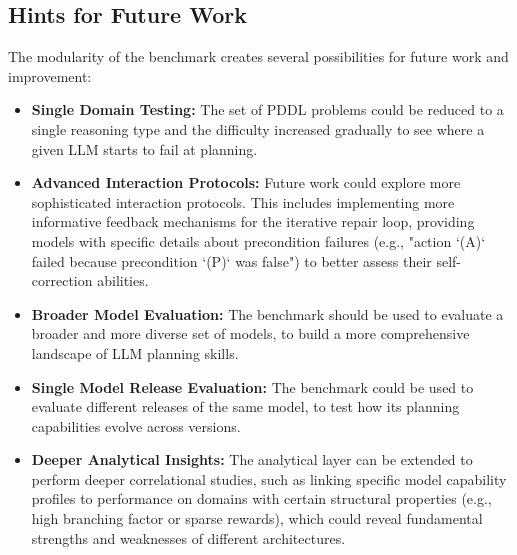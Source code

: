\subsection{Hints for Future Work}
The modularity of the benchmark creates several possibilities for future work and improvement:
\begin{itemize}
    \item \textbf{Single Domain Testing:} The set of PDDL problems could be reduced to a single reasoning type and the difficulty increased gradually to see where a given LLM starts to fail at planning.
    
    \item \textbf{Advanced Interaction Protocols:} Future work could explore more sophisticated interaction protocols. This includes implementing more informative feedback mechanisms for the iterative repair loop, providing models with specific details about precondition failures (e.g., "action `(A)` failed because precondition `(P)` was false") to better assess their self-correction abilities.
    
    \item \textbf{Broader Model Evaluation:} The benchmark should be used to evaluate a broader and more diverse set of models, to build a more comprehensive landscape of LLM planning skills.

    \item \textbf{Single Model Release Evaluation:} The benchmark could be used to evaluate different releases of the same model, to test how its planning capabilities evolve across versions.
    
    \item \textbf{Deeper Analytical Insights:} The analytical layer can be extended to perform deeper correlational studies, such as linking specific model capability profiles to performance on domains with certain structural properties (e.g., high branching factor or sparse rewards), which could reveal fundamental strengths and weaknesses of different architectures.
\end{itemize}
